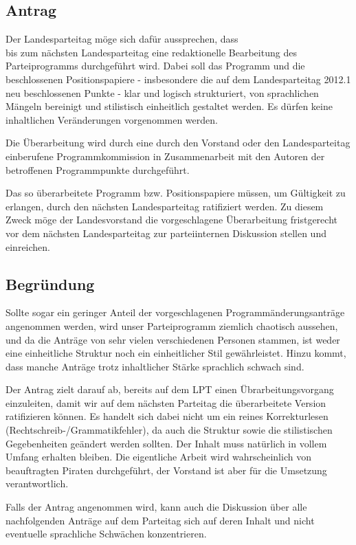 \subsection{Antrag}
Der Landesparteitag möge sich dafür aussprechen, dass\\
bis zum nächsten Landesparteitag eine redaktionelle Bearbeitung des Parteiprogramms
durchgeführt wird. Dabei soll das Programm und die beschlossenen Positionspapiere - insbesondere
die auf dem Landesparteitag 2012.1 neu beschlossenen Punkte - klar und logisch strukturiert, von
sprachlichen Mängeln bereinigt und stilistisch einheitlich gestaltet werden. Es dürfen keine
inhaltlichen Veränderungen vorgenommen werden.\par
Die Überarbeitung wird durch eine durch den Vorstand oder den Landesparteitag einberufene
Programmkommission in Zusammenarbeit mit den Autoren der betroffenen Programmpunkte
durchgeführt.\par
Das so überarbeitete Programm bzw. Positionspapiere müssen, um Gültigkeit zu erlangen, durch
den nächsten Landesparteitag ratifiziert werden. Zu diesem Zweck möge der Landesvorstand die
vorgeschlagene Überarbeitung fristgerecht vor dem nächsten Landesparteitag zur parteiinternen
Diskussion stellen und einreichen.

\subsection{Begründung}
Sollte sogar ein geringer Anteil der vorgeschlagenen Programmänderungsanträge angenommen
werden, wird unser Parteiprogramm ziemlich chaotisch aussehen, und da die Anträge von sehr
vielen verschiedenen Personen stammen, ist weder eine einheitliche Struktur noch ein einheitlicher
Stil gewährleistet. Hinzu kommt, dass manche Anträge trotz inhaltlicher Stärke sprachlich schwach
sind.\par
Der Antrag zielt darauf ab, bereits auf dem LPT einen Übrarbeitungsvorgang einzuleiten, damit wir
auf dem nächsten Parteitag die überarbeitete Version ratifizieren können. Es handelt sich dabei nicht
um ein reines Korrekturlesen (Rechtschreib-/Grammatikfehler), da auch die Struktur sowie die
stilistischen Gegebenheiten geändert werden sollten. Der Inhalt muss natürlich in vollem Umfang
erhalten bleiben. Die eigentliche Arbeit wird wahrscheinlich von beauftragten Piraten durchgeführt,
der Vorstand ist aber für die Umsetzung verantwortlich.\par
Falls der Antrag angenommen wird, kann auch die Diskussion über alle nachfolgenden Anträge auf
dem Parteitag sich auf deren Inhalt und nicht eventuelle sprachliche Schwächen konzentrieren.
